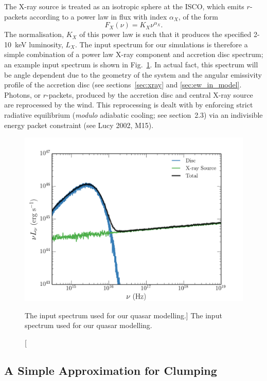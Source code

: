 The X-ray source is treated as an isotropic sphere at the ISCO,
which emits $r$-packets according to a power law in flux with index $\alpha_X$, of the form
\begin{equation}
F_X (\nu) = K_X \nu^{\alpha_X}.
\end{equation}
The normalisation, $K_X$ of this power law is such that it 
produces the specified 2-10~keV luminosity, $L_X$.
The input spectrum for our simulations is therefore a simple combination
of a power law X-ray component and accretion disc spectrum; an example input
spectrum is shown in Fig.~\ref{fig:qso_model_sed}. In actual fact, this
spectrum will be angle dependent due to the geometry of the system and 
the angular emissivity profile of the accretion disc (see sections~\ref{sec:xray}
and \ref{sec:ew_in_model}.
Photons, or $r$-packets, produced by the accretion disc and central X-ray source
are reprocessed by the wind. This reprocessing is dealt with by enforcing strict
radiative equilibrium ({\em modulo} adiabatic cooling; see section~2.3)
via an indivisible energy packet constraint (see Lucy 2002, M15).  

\begin{figure} 
\centering
\includegraphics[width=1.0\textwidth]{figures/06-agnpaper/qso_model_sed.png}
\caption
[The input spectrum used for our quasar modelling.]
{
The input spectrum used for our quasar modelling.
}
\label{fig:qso_model_sed}
\end{figure} 

\subsection{A Simple Approximation for Clumping}

